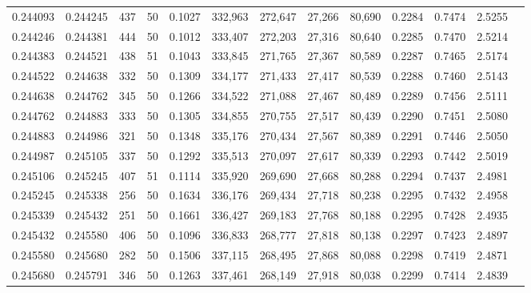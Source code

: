 \begin{tabular}{rrrrrrrrrrrrr}
0.244093 & 0.244245 &   437 &  50 &                                     0.1027 & 332,963 & 272,647 &  27,266 &  80,690 & 0.2284 & 0.7474 & 2.5255 \\
0.244246 & 0.244381 &   444 &  50 &                                     0.1012 & 333,407 & 272,203 &  27,316 &  80,640 & 0.2285 & 0.7470 & 2.5214 \\
0.244383 & 0.244521 &   438 &  51 &                                     0.1043 & 333,845 & 271,765 &  27,367 &  80,589 & 0.2287 & 0.7465 & 2.5174 \\
0.244522 & 0.244638 &   332 &  50 &                                     0.1309 & 334,177 & 271,433 &  27,417 &  80,539 & 0.2288 & 0.7460 & 2.5143 \\
0.244638 & 0.244762 &   345 &  50 &                                     0.1266 & 334,522 & 271,088 &  27,467 &  80,489 & 0.2289 & 0.7456 & 2.5111 \\
0.244762 & 0.244883 &   333 &  50 &                                     0.1305 & 334,855 & 270,755 &  27,517 &  80,439 & 0.2290 & 0.7451 & 2.5080 \\
0.244883 & 0.244986 &   321 &  50 &                                     0.1348 & 335,176 & 270,434 &  27,567 &  80,389 & 0.2291 & 0.7446 & 2.5050 \\
0.244987 & 0.245105 &   337 &  50 &                                     0.1292 & 335,513 & 270,097 &  27,617 &  80,339 & 0.2293 & 0.7442 & 2.5019 \\
0.245106 & 0.245245 &   407 &  51 &                                     0.1114 & 335,920 & 269,690 &  27,668 &  80,288 & 0.2294 & 0.7437 & 2.4981 \\
0.245245 & 0.245338 &   256 &  50 &                                     0.1634 & 336,176 & 269,434 &  27,718 &  80,238 & 0.2295 & 0.7432 & 2.4958 \\
0.245339 & 0.245432 &   251 &  50 &                                     0.1661 & 336,427 & 269,183 &  27,768 &  80,188 & 0.2295 & 0.7428 & 2.4935 \\
0.245432 & 0.245580 &   406 &  50 &                                     0.1096 & 336,833 & 268,777 &  27,818 &  80,138 & 0.2297 & 0.7423 & 2.4897 \\
0.245580 & 0.245680 &   282 &  50 &                                     0.1506 & 337,115 & 268,495 &  27,868 &  80,088 & 0.2298 & 0.7419 & 2.4871 \\
0.245680 & 0.245791 &   346 &  50 &                                     0.1263 & 337,461 & 268,149 &  27,918 &  80,038 & 0.2299 & 0.7414 & 2.4839 \\

\end{tabular}
